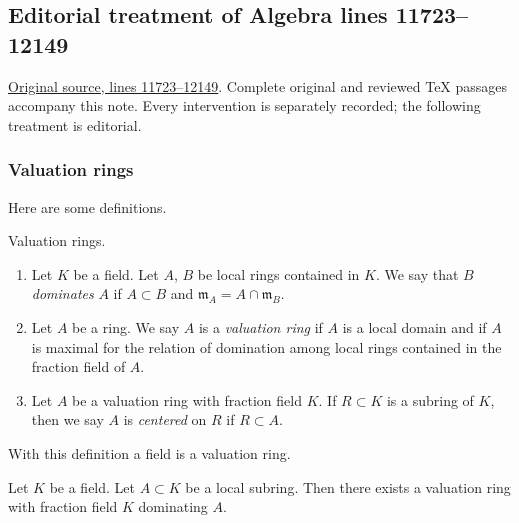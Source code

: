 \subsection{Editorial treatment of Algebra lines 11723--12149}

\hypertarget{algebra-context-157}{}

\noindent\href{https://github.com/stacks/stacks-project/blob/a04446e57ec1fbc252a871afcec7752fb2807b14/algebra.tex\#L11723}{Original source, lines 11723--12149}. Complete original and reviewed TeX passages accompany this note. Every intervention is separately recorded; the following treatment is editorial.


\subsubsection{Valuation rings}
\label{editorial-source-section-valuation-rings}

\noindent
Here are some definitions.

\begin{definition}
\label{editorial-source-definition-valuation-ring}
Valuation rings.
\begin{enumerate}
\item Let $K$ be a field. Let $A$, $B$ be local rings contained
in $K$. We say that $B$ {\it dominates} $A$ if $A \subset B$
and $\mathfrak m_A = A \cap \mathfrak m_B$.
\item Let $A$ be a ring. We say $A$ is a {\it valuation ring}
if $A$ is a local domain and if $A$ is maximal
for the relation of domination among local rings contained in
the fraction field of $A$.
\item Let $A$ be a valuation ring with fraction field $K$.
If $R \subset K$ is a subring of $K$, then we say $A$
is {\it centered} on $R$ if $R \subset A$.
\end{enumerate}
\end{definition}

\noindent
With this definition a field is a valuation ring.

\begin{lemma}
\label{editorial-source-lemma-dominate}
Let $K$ be a field. Let $A \subset K$ be a local subring.
Then there exists a valuation ring with fraction field $K$
dominating $A$.
\end{lemma}

